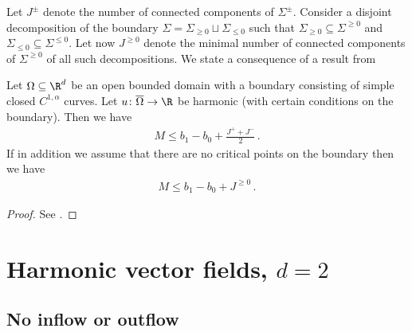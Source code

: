 Let $J^\pm$ denote the number of connected components of $\Sigma^\pm$.
Consider a disjoint decomposition of the boundary $\Sigma=\Sigma_{\geq0}\sqcup\Sigma_{\leq0}$ such
that $\Sigma_{\geq0}\subseteq\Sigma^{\geq0}$ and $\Sigma_{\leq0}\subseteq\Sigma^{\leq0}$.
Let now $J^{\geq0}$ denote the minimal number of connected components of $\Sigma^{\geq0}$ of all such
decompositions.
We state a consequence of a result from \cite[Theorem 2.1]{Alessandrini1992}
\begin{proposition} 
  Let $\Omega\subseteq\R^d$ be an open bounded domain with a boundary consisting of simple closed $C^{1,\alpha}$ curves.
  Let $u\colon \overline{\Omega}\to \R$ be harmonic (with certain conditions on the boundary).
  Then we have
  \begin{align*}
    M\leq b_1-b_0+\frac{J^++J^-}{2}\,.
  \end{align*}
  If in addition we assume that there are no critical points on the boundary then we have
  \begin{align*}
    M\leq b_1-b_0+J^{\geq0}\,.
  \end{align*}
\end{proposition}
\begin{proof}
  See \cite[Theorem 2.1]{Alessandrini1992}.
\end{proof}

\newpage

\chapter{Harmonic vector fields, $d=2$}


\section{No inflow or outflow}

